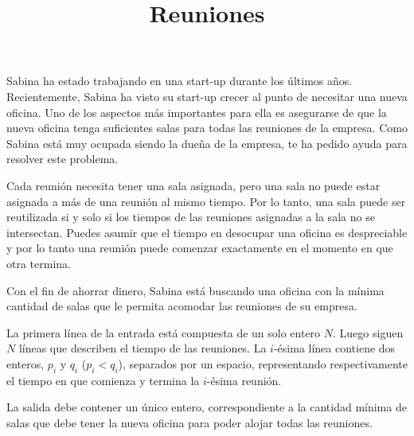 \documentclass{oci}
\title{Reuniones}
\begin{document}
\begin{problemDescription}
  Sabina ha estado trabajando en una start-up durante los últimos años.
  Recientemente, Sabina ha visto su start-up crecer al punto de necesitar una
  nueva oficina.
  Uno de los aspectos más importantes para ella es
  asegurarse de que la nueva oficina tenga suficientes salas para todas las
  reuniones de la empresa.
  Como Sabina está muy ocupada siendo la dueña de la empresa, te ha pedido
  ayuda para resolver este problema.

  Cada reunión necesita tener una sala asignada, pero una sala no
  puede estar asignada a más de una reunión al mismo tiempo.
  Por lo tanto, una sala puede ser reutilizada si y solo si los tiempos de las
  reuniones asignadas a la sala no se intersectan.
  Puedes asumir que el tiempo en desocupar una oficina es despreciable y por
  lo tanto una reunión puede comenzar exactamente en el momento en que otra
  termina.

  Con el fin de ahorrar dinero, Sabina está buscando una oficina con la mínima
  cantidad de salas que le permita acomodar las reuniones de su empresa.
\end{problemDescription}

\begin{inputDescription}
    La primera línea de la entrada está compuesta de un solo entero $N$.
    Luego siguen $N$ líneas que describen el tiempo de las reuniones.
    La $i$-ésima línea contiene dos enteros, $p_i$ y $q_i$ ($p_i < q_i$),
    separados por un espacio, representando respectivamente el tiempo en que
    comienza y termina la $i$-ésima reunión.
\end{inputDescription}

\begin{outputDescription}
    La salida debe contener un único entero, correspondiente a la cantidad
    mínima de salas que debe tener la nueva oficina para poder alojar todas las
    reuniones.
\end{outputDescription}
\end{document}
